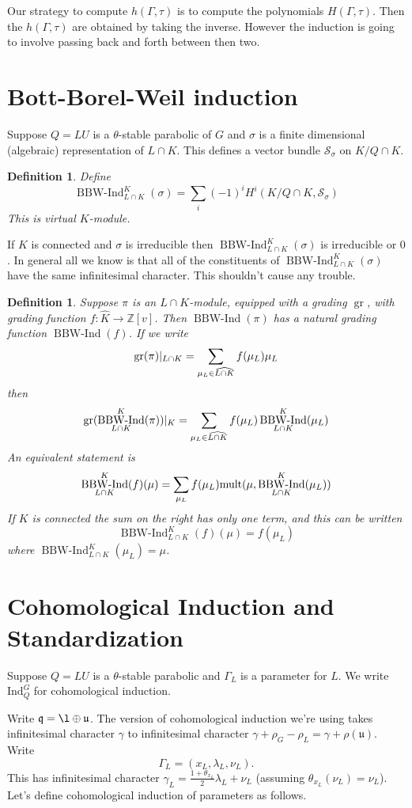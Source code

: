 \documentclass[12pt,leqno]{article}
\newtheorem{definition}[equation]{Definition}
\DeclareMathOperator{\gr}{\text{gr}}
\DeclareMathOperator{\bbwind}{\text{BBW-Ind}}
\newcommand{\mult}{\text{mult}}
\newcommand{\Ind}{\text{Ind}}
\newcommand{\Z}{\mathbb Z}
\renewcommand{\q}{\mathfrak q}
\renewcommand{\u}{\mathfrak u}
\renewcommand{\sec}[1]{\section{#1}
\renewcommand{\theequation}{\thesection.\arabic{equation}}
  \setcounter{equation}{0}}
\newcommand{\Khat}{\widehat K}
\newcommand{\LKhat}{\widehat{L\cap K}}
\renewcommand{\sec}[1]{\section{#1}
\renewcommand{\theequation}{\thesection.\arabic{equation}}
  \setcounter{equation}{0}}
\begin{document}
Our strategy to compute $h(\Gamma,\tau)$ is to compute
the polynomials $H(\Gamma,\tau)$.
Then the  $h(\Gamma,\tau)$ are obtained by
taking the inverse. However the induction is going to involve passing
back and forth between then two.


\sec{Bott-Borel-Weil induction}

Suppose $Q=LU$ is a $\theta$-stable parabolic of $G$ and $\sigma$ is a
finite dimensional (algebraic) representation of $L\cap K$. This
defines a vector bundle $\mathcal S_\sigma$ on $K/Q\cap K$.

\begin{definition}
Define
{\normalfont
$$
\bbwind_{L\cap K}^K(\sigma)=\sum_i (-1)^i H^i(K/Q\cap K,\mathcal
S_\sigma)
$$
}
This is virtual $K$-module.
\end{definition}

\begin{danger}
If $K$ is connected and $\sigma$ is irreducible then $\bbwind_{L\cap K}^K(\sigma)$ is irreducible or $0$.
In general all we know is that all of the constituents of $\bbwind_{L\cap K}^K(\sigma)$ have the same infinitesimal character.
This shouldn't cause any trouble.
\end{danger}

\begin{definition}
\label{d:bbwindhodge}
Suppose $\pi$ is an $L\cap K$-module, equipped with a grading $\gr$, with grading function  $f:\Khat\rightarrow\Z[v]$.
Then $\bbwind(\pi)$ has a natural grading function $\bbwind(f)$. If we write
$$
\normalfont
\gr(\pi)|_{L\cap K}
=\sum_{\mu_L\in\LKhat} f(\mu_L)\mu_L
$$
then
$$
\normalfont
\gr(\bbwind_{L\cap K}^K(\pi))|_K=
\sum_{\mu_L\in\LKhat} f(\mu_L)\bbwind_{L\cap K}^K(\mu_L)
$$
An equivalent statement is
$$
\normalfont
\bbwind_{L\cap K}^K(f)(\mu)=\sum_{\mu_L}f(\mu_L)\mult(\mu,\bbwind_{L\cap K}^K(\mu_L))
$$
If $K$ is connected the sum on the right has only one term, and this can be written
{\normalfont
$$
\bbwind_{L\cap K}^K(f)(\mu)=f(\mu_L)
$$
where $\bbwind_{L\cap K}^K(\mu_L)=\mu$.}

\end{definition}

\sec{Cohomological Induction and Standardization}

Suppose $Q=LU$ is a $\theta$-stable parabolic and
$\Gamma_L$ is a parameter for $L$. We write $\Ind_Q^G$ for cohomological induction.

Write $\q=\l\oplus\u$.
The version of cohomological induction we're using takes infinitesimal
character $\gamma$ to infinitesimal character $\gamma+\rho_G-\rho_L=\gamma+\rho(\u)$.
Write
$$
\Gamma_L=(x_L,\lambda_L,\nu_L).
$$
This has infinitesimal character
$\gamma_L=\frac{1+\theta_{x_L}}2\lambda_L+\nu_L$
(assuming $\theta_{x_L}(\nu_L)=\nu_L$).
Let's define cohomological induction of parameters as follows.
\end{document}

